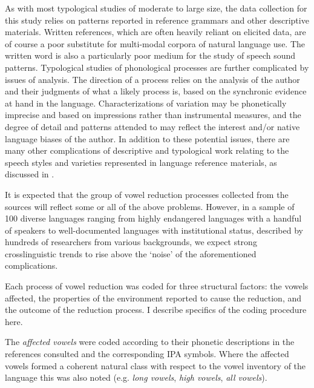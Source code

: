   As with most typological studies of moderate to large size, the data collection for this study relies on patterns reported in reference grammars and other descriptive materials. Written references, which are often heavily reliant on elicited data, are of course a poor substitute for multi-modal corpora of natural language use. The written word is also a particularly poor medium for the study of speech sound patterns. Typological studies of phonological processes are further complicated by issues of analysis. The direction of a process relies on the analysis of the author and their judgments of what a likely process is, based on the synchronic evidence at hand in the language. Characterizations of variation may be phonetically imprecise and based on impressions rather than instrumental measures, and the degree of detail and patterns attended to may reflect the interest and/or native language biases of the author. In addition to these potential issues, there are many other complications of descriptive and typological work relating to the speech styles and varieties represented in language reference materials, as discussed in .

  It is expected that the group of vowel reduction processes collected from the sources will reflect some or all of the above problems. However, in a sample of 100 diverse languages ranging from highly endangered languages with a handful of speakers to well-documented languages with institutional status, described by hundreds of researchers from various backgrounds, we expect strong crosslinguistic trends to rise above the ‘noise’ of the aforementioned complications.

  Each process of vowel reduction was coded for three structural factors: the vowels affected, the properties of the environment reported to cause the reduction, and the outcome of the reduction process. I describe specifics of the coding procedure here.

  The \textit{affected vowels} were coded according to their phonetic descriptions in the references consulted and the corresponding IPA symbols. Where the affected vowels formed a coherent natural class with respect to the vowel inventory of the language this was also noted (e.g. \textit{long vowels}, \textit{high vowels}, \textit{all vowels}).

